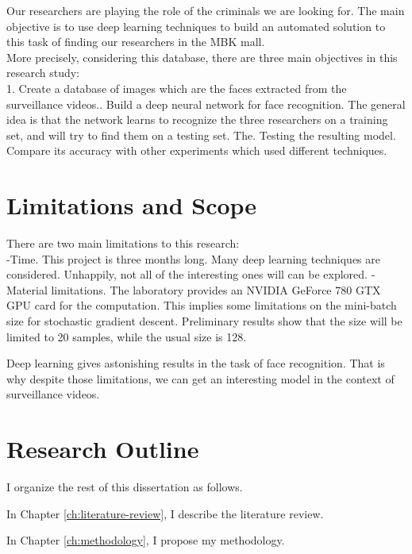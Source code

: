 Our researchers are playing the role of the criminals we are looking for.
The main objective is to use deep learning techniques to build an automated solution to this task of finding our researchers in the MBK mall.\\

More precisely, considering this database, there are three main objectives in this research study:\\
1. Create a database of images which are the faces extracted from the surveillance videos.. Build a deep neural network for face recognition. The general idea is that the network learns to recognize the three researchers on a training set, and will try to find them on a testing set. The. Testing the resulting model. Compare its accuracy with other experiments which used different techniques.

\section{Limitations and Scope}

There are two main limitations to this research:\\
-Time. This project is three months long. Many deep learning techniques are considered. Unhappily, not all of the interesting ones will can be explored.\newline
-Material limitations. The laboratory provides an NVIDIA GeForce 780 GTX GPU card for the computation. This implies some limitations on the mini-batch size for stochastic gradient descent. Preliminary results show that the size will be limited to 20 samples, while the usual size is 128.\newline

Deep learning gives astonishing results in the task of face recognition. That is why despite those limitations, we can get an interesting model in the context of surveillance videos.  

\section{Research Outline}

I organize the rest of this dissertation as follows.

In Chapter \ref{ch:literature-review}, I describe the literature review.

In Chapter \ref{ch:methodology}, I propose my methodology.



\FloatBarrier

